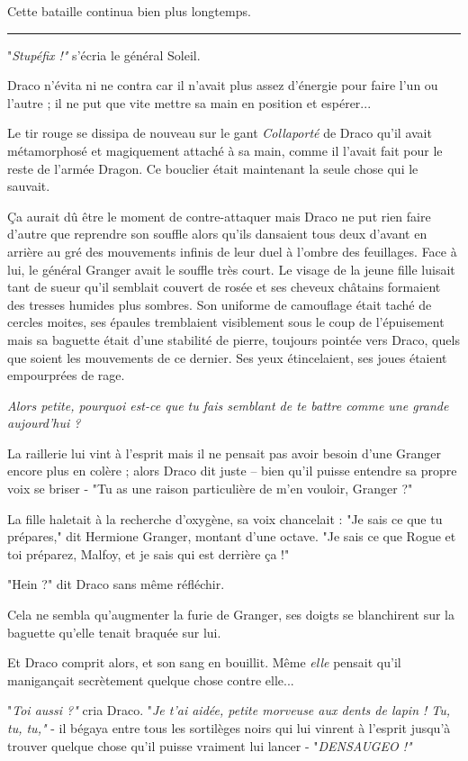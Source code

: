 Cette bataille continua bien plus longtemps.
\par\noindent\rule{\textwidth}{0.4pt}
"\emph{Stupéfix !"}  s'écria le général Soleil.

Draco n'évita ni ne contra car il n'avait plus assez d'énergie pour faire l'un ou l'autre ; il ne put que vite mettre sa main en position et espérer...

Le tir rouge se dissipa de nouveau sur le gant \emph{Collaporté}  de Draco qu'il avait métamorphosé et magiquement attaché à sa main, comme il l'avait fait pour le reste de l'armée Dragon. Ce bouclier était maintenant la seule chose qui le sauvait.

Ça aurait dû être le moment de contre-attaquer mais Draco ne put rien faire d'autre que reprendre son souffle alors qu'ils dansaient tous deux d'avant en arrière au gré des mouvements infinis de leur duel à l'ombre des feuillages. Face à lui, le général Granger avait le souffle très court. Le visage de la jeune fille luisait tant de sueur qu'il semblait couvert de rosée et ses cheveux châtains formaient des tresses humides plus sombres. Son uniforme de camouflage était taché de cercles moites, ses épaules tremblaient visiblement sous le coup de l'épuisement mais sa baguette était d'une stabilité de pierre, toujours pointée vers Draco, quels que soient les mouvements de ce dernier. Ses yeux étincelaient, ses joues étaient empourprées de rage.

\emph{Alors petite, pourquoi est-ce que tu fais semblant de te battre comme une grande aujourd'hui ?} 

La raillerie lui vint à l'esprit mais il ne pensait pas avoir besoin d'une Granger encore plus en colère ; alors Draco dit juste – bien qu'il puisse entendre sa propre voix se briser - "Tu as une raison particulière de m'en vouloir, Granger ?"

La fille haletait à la recherche d'oxygène, sa voix chancelait : "Je sais ce que tu prépares," dit Hermione Granger, montant d'une octave. "Je sais ce que Rogue et toi préparez, Malfoy, et je sais qui est derrière ça !"

"Hein ?" dit Draco sans même réfléchir.

Cela ne sembla qu'augmenter la furie de Granger, ses doigts se blanchirent sur la baguette qu'elle tenait braquée sur lui.

Et Draco comprit alors, et son sang en bouillit. Même \emph{elle}  pensait qu'il manigançait secrètement quelque chose contre elle...

"\emph{Toi aussi ?"}  cria Draco. "\emph{Je t'ai aidée, petite morveuse aux dents de lapin ! Tu, tu, tu,"}  - il bégaya entre tous les sortilèges noirs qui lui vinrent à l'esprit jusqu'à trouver quelque chose qu'il puisse vraiment lui lancer - "\emph{DENSAUGEO !"} 

